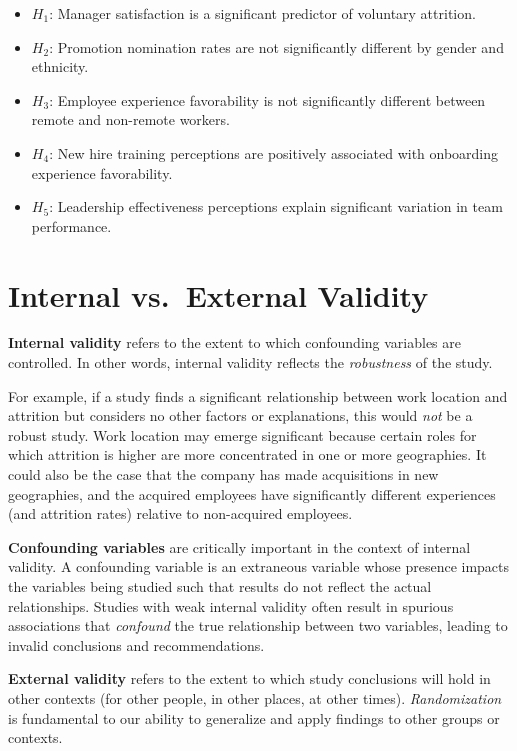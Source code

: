 \documentclass[
]{book}
\providecommand{\tightlist}{%
  \setlength{\itemsep}{0pt}\setlength{\parskip}{0pt}}
\begin{document}
\begin{itemize}
\tightlist
\item
  \(H_1\): Manager satisfaction is a significant predictor of voluntary attrition.
\item
  \(H_2\): Promotion nomination rates are not significantly different by gender and ethnicity.
\item
  \(H_3\): Employee experience favorability is not significantly different between remote and non-remote workers.
\item
  \(H_4\): New hire training perceptions are positively associated with onboarding experience favorability.
\item
  \(H_5\): Leadership effectiveness perceptions explain significant variation in team performance.
\end{itemize}

\hypertarget{internal-vs.-external-validity}{%
\section{Internal vs.~External Validity}\label{internal-vs.-external-validity}}

\textbf{Internal validity} refers to the extent to which confounding variables are controlled. In other words, internal validity reflects the \emph{robustness} of the study.

For example, if a study finds a significant relationship between work location and attrition but considers no other factors or explanations, this would \emph{not} be a robust study. Work location may emerge significant because certain roles for which attrition is higher are more concentrated in one or more geographies. It could also be the case that the company has made acquisitions in new geographies, and the acquired employees have significantly different experiences (and attrition rates) relative to non-acquired employees.

\textbf{Confounding variables} are critically important in the context of internal validity. A confounding variable is an extraneous variable whose presence impacts the variables being studied such that results do not reflect the actual relationships. Studies with weak internal validity often result in spurious associations that \emph{confound} the true relationship between two variables, leading to invalid conclusions and recommendations.

\textbf{External validity} refers to the extent to which study conclusions will hold in other contexts (for other people, in other places, at other times). \emph{Randomization} is fundamental to our ability to generalize and apply findings to other groups or contexts.
\end{document}
